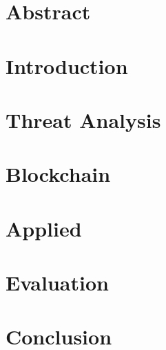 \documentclass[11pt]{article}
\begin{document}

\clearpage


\tableofcontents
\clearpage

\section{Abstract}

\clearpage

\section{Introduction}
\label{sec:intro}

\clearpage

\section{Threat Analysis}
\label{sec:threat}

\clearpage

\section{Blockchain}
\label{sec:block}

\clearpage

\section{Applied}
\label{sec:applied}

\clearpage

\section{Evaluation}
\label{sec:eval}

\clearpage

\section{Conclusion}
\label{sec:conc}

\clearpage

{}

\end{document}
